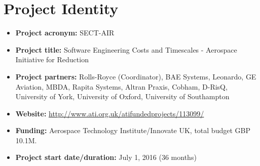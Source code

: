 \section{Project Identity}

\newcommand{\bitem}[1]{\item \textbf{#1:}}

\begin{itemize}
	\bitem{Project acronym} SECT-AIR
	\bitem{Project title} Software Engineering Costs and Timescales - Aerospace Initiative for Reduction
	\bitem{Project partners} Rolls-Royce (Coordinator), BAE Systems, Leonardo, GE Aviation, MBDA, Rapita Systems, Altran Praxis, Cobham, D-RisQ, University of York, University of Oxford, University of Southampton 
	\bitem{Website} \url{http://www.ati.org.uk/atifundedprojects/113099/} 
	\bitem{Funding} Aerospace Technology Institute/Innovate UK, total budget GBP 10.1M.
	\bitem{Project start date/duration} July 1, 2016 (36 months)
\end{itemize}